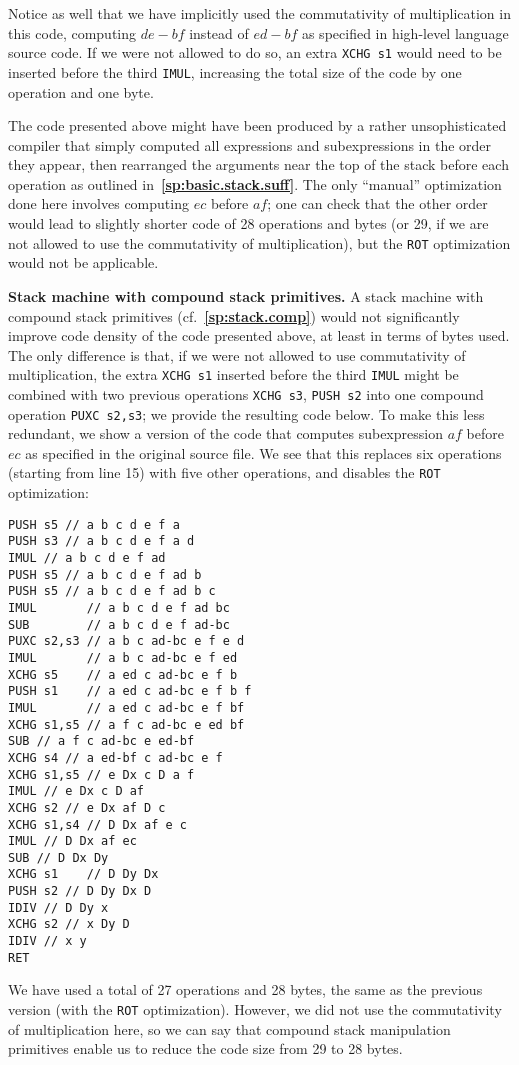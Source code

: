 \documentclass[12pt,oneside]{article}
\def\makepoint#1{\medbreak\noindent{\bf #1.\ }}
\def\nxsubpoint{\refstepcounter{subsubsection}%
    \smallbreak\makepoint{\thesubsubsection}}
\def\refpoint#1{{\rm\textbf{\ref{#1}}}}
\let\ptref=\refpoint
\def\emb#1{\textbf{#1.}}
\begin{document}
Notice as well that we have implicitly used the commutativity of multiplication in this code, computing $de-bf$ instead of $ed-bf$ as specified in high-level language source code. If we were not allowed to do so, an extra \texttt{XCHG s1} would need to be inserted before the third \texttt{IMUL}, increasing the total size of the code by one operation and one byte.

The code presented above might have been produced by a rather unsophisticated compiler that simply computed all expressions and subexpressions in the order they appear, then rearranged the arguments near the top of the stack before each operation as outlined in~\ptref{sp:basic.stack.suff}. The only ``manual'' optimization done here involves computing $ec$ before $af$; one can check that the other order would lead to slightly shorter code of 28 operations and bytes (or 29, if we are not allowed to use the commutativity of multiplication), but the \texttt{ROT} optimization would not be applicable.

\nxsubpoint\emb{Stack machine with compound stack primitives}
A stack machine with compound stack primitives (cf.~\ptref{sp:stack.comp}) would not significantly improve code density of the code presented above, at least in terms of bytes used. The only difference is that, if we were not allowed to use commutativity of multiplication, the extra \texttt{XCHG s1} inserted before the third \texttt{IMUL} might be combined with two previous operations \texttt{XCHG s3}, \texttt{PUSH s2} into one compound operation \texttt{PUXC s2,s3}; we provide the resulting code below. To make this less redundant, we show a version of the code that computes subexpression $af$ before $ec$ as specified in the original source file. We see that this replaces six operations (starting from line 15) with five other operations, and disables the \texttt{ROT} optimization:
\begin{verbatim}
PUSH s5 // a b c d e f a
PUSH s3 // a b c d e f a d
IMUL // a b c d e f ad
PUSH s5 // a b c d e f ad b
PUSH s5 // a b c d e f ad b c
IMUL       // a b c d e f ad bc
SUB        // a b c d e f ad-bc
PUXC s2,s3 // a b c ad-bc e f e d
IMUL       // a b c ad-bc e f ed
XCHG s5    // a ed c ad-bc e f b
PUSH s1    // a ed c ad-bc e f b f
IMUL       // a ed c ad-bc e f bf
XCHG s1,s5 // a f c ad-bc e ed bf
SUB // a f c ad-bc e ed-bf
XCHG s4 // a ed-bf c ad-bc e f
XCHG s1,s5 // e Dx c D a f
IMUL // e Dx c D af
XCHG s2 // e Dx af D c
XCHG s1,s4 // D Dx af e c
IMUL // D Dx af ec
SUB // D Dx Dy
XCHG s1    // D Dy Dx
PUSH s2 // D Dy Dx D
IDIV // D Dy x
XCHG s2 // x Dy D
IDIV // x y
RET
\end{verbatim}
We have used a total of 27 operations and 28 bytes, the same as the previous version (with the \texttt{ROT} optimization). However, we did not use the commutativity of multiplication here, so we can say that compound stack manipulation primitives enable us to reduce the code size from 29 to 28 bytes.
\end{document}
